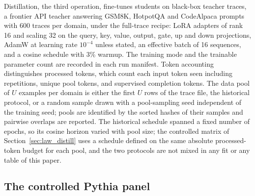 Distillation, the third operation, fine-tunes students on black-box teacher traces, a frontier API teacher
answering GSM8K, HotpotQA and CodeAlpaca prompts with 600 traces per domain, under the full-trace
recipe: LoRA adapters of rank 16 and scaling 32 on the query, key, value, output, gate, up and down
projections, AdamW at learning rate $10^{-4}$ unless stated, an effective batch of 16 sequences, and
a cosine schedule with 3\% warmup. The training mode and the trainable parameter count are recorded
in each run manifest. Token accounting distinguishes processed tokens, which count each input token seen including repetitions, unique pool tokens, and supervised completion tokens. The data pool of $U$
examples per domain is either the first $U$ rows of the trace file, the historical protocol, or a
random sample drawn with a pool-sampling seed independent of the training seed; pools are
identified by the sorted hashes of their samples and pairwise overlaps are reported. The historical
schedule spanned a fixed number of epochs, so its cosine horizon varied with pool size; the
controlled matrix of Section~\ref{sec:law_distill} uses a schedule defined on the same absolute
processed-token budget for each pool, and the two protocols are not mixed in any fit or any table of this paper.

\subsection{The controlled Pythia panel}
\label{sec:app_pythia}

